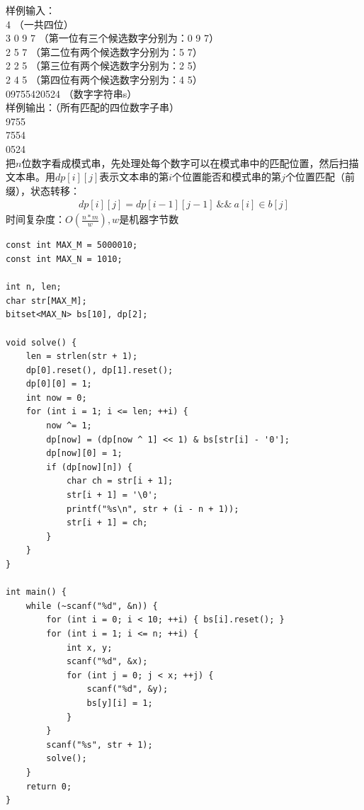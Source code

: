 样例输入： \\
4 （一共四位） \\
3 0 9 7 （第一位有三个候选数字分别为：0 9 7） \\
2 5 7   （第二位有两个候选数字分别为：5 7） \\
2 2 5   （第三位有两个候选数字分别为：2 5） \\
2 4 5   （第四位有两个候选数字分别为：4 5） \\
09755420524 （数字字符串s） \\

样例输出：（所有匹配的四位数字子串） \\
9755 \\
7554 \\
0524\\

把$n$位数字看成模式串，先处理处每个数字可以在模式串中的匹配位置，然后扫描文本串。用$dp[i][j]$表示文本串的第$i$个位置能否和模式串的第$j$个位置匹配（前缀），状态转移：
$$
\begin{aligned}
dp[i][j]=dp[i-1][j-1]\ \&\&\ a[i]\in b[j]
\end{aligned}
$$
时间复杂度：$O(\frac{n*m}{w}),w$是机器字节数
\begin{lstlisting}
const int MAX_M = 5000010;
const int MAX_N = 1010;

int n, len;
char str[MAX_M];
bitset<MAX_N> bs[10], dp[2];

void solve() {
	len = strlen(str + 1);
	dp[0].reset(), dp[1].reset();
	dp[0][0] = 1;
	int now = 0;
	for (int i = 1; i <= len; ++i) {
		now ^= 1;
		dp[now] = (dp[now ^ 1] << 1) & bs[str[i] - '0'];
		dp[now][0] = 1;
		if (dp[now][n]) {
			char ch = str[i + 1];
			str[i + 1] = '\0';
			printf("%s\n", str + (i - n + 1));
			str[i + 1] = ch;
		}
	}
}

int main() {
	while (~scanf("%d", &n)) {
		for (int i = 0; i < 10; ++i) { bs[i].reset(); }
		for (int i = 1; i <= n; ++i) {
			int x, y;
			scanf("%d", &x);
			for (int j = 0; j < x; ++j) {
				scanf("%d", &y);
				bs[y][i] = 1;
			}
		}
		scanf("%s", str + 1);
		solve();
	}
	return 0;
}
\end{lstlisting}

%
